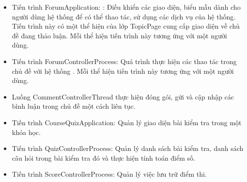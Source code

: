 \documentclass[./../main_file.tex]{subfiles}
\begin{document}
\begin{itemize}
		\item Tiến trình ForumApplication: : Điều khiển các giao diện, biểu mẫu dành cho người dùng hệ thống để có thể thao tác, sử dụng các dịch vụ của hệ thống. Tiến trình này có một thể hiện của lớp TopicPage cung cấp giao diện về chủ đề đang thảo luận.
		Mỗi thể hiện tiến trình này tương ứng với một người dùng.
		\item Tiến trình ForumControllerProcess: Quá trình thực hiện các thao tác trong chủ đề với hệ thống .
		Mỗi thể hiện tiến trình này tương ứng với một người dùng.
		\item Luồng CommentControllerThread thực hiện đóng gói, gửi và cập nhập các bình luận trong chủ đề một cách liên tục.
		
		\item Tiến trình CourseQuizApplication: Quản lý giao diện bài kiểm tra trong một khóa học.
		\item Tiến trình QuizControllerProcess: Quản lý danh sách bài kiểm tra, danh sách câu hỏi trong bài kiểm tra đó và thực hiện tính toán điểm số.
		\item Tiến trình ScoreControllerProcess: Quản lý việc lưu trữ điểm thi.
		

\end{itemize}
\end{document}
